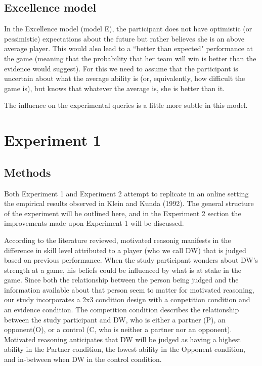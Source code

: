 \documentclass{article}
\begin{document}
\subsection{Excellence model}
In the Excellence model (model E), the participant does not have optimistic (or pessimistic) expectations about the future but rather believes she is an above average player. This would also lead to a ``better than expected" performance at the game (meaning that the probability that her team will win is better than the evidence would suggest). For this we need to assume that the participant is uncertain about what the average ability is (or, equivalently, how difficult the game is), but knows that whatever the average is, she is better than it.

The influence on the experimental queries is a little more subtle in this model. 

\section{Experiment 1}

\subsection{Methods}

Both Experiment 1 and Experiment 2 attempt to replicate in an online setting the empirical results observed in Klein and Kunda (1992). The general structure of the experiment will be outlined here, and in the Experiment 2 section the improvements made upon Experiment 1 will be discussed.

According to the literature reviewed, motivated reasonig manifests in the difference in skill level attributed to a player (who we call DW) that is judged based on previous performance. When the study participant wonders about DW's strength at a game, his beliefs could be influenced by what is at stake in the game. Since both the relationship between the person being judged and the information available about that person seem to matter for motivated reasoning, our study incorporates a 2x3 condition design with a conpetition condition and an evidence condition. The competition condition describes the relationship between the study participant and DW, who is either a partner (P), an opponent(O), or a control (C, who is neither a partner nor an opponent). Motivated reasoning anticipates that DW will be judged as having a highest ability in the Partner condition, the lowest ability in the Opponent condition, and in-between when DW in the control condition. 
\end{document}
